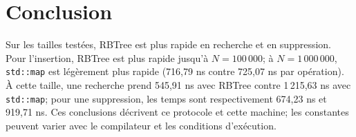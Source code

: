 \documentclass[11pt,a4paper]{article}
\begin{document}
\section{\textcolor{bleuTP}{Conclusion}}
Sur les tailles testées, RBTree est plus rapide en recherche et en suppression.
Pour l'insertion, RBTree est plus rapide jusqu'à $N=100\,000$; à
$N=1\,000\,000$, \texttt{std::map} est légèrement plus rapide
(716,79 ns contre 725,07 ns par opération). À cette taille, une recherche
prend 545,91 ns avec RBTree contre 1\,215,63 ns avec \texttt{std::map};
pour une suppression, les temps sont respectivement 674,23 ns et 919,71 ns.
Ces conclusions décrivent ce protocole et cette machine; les constantes
peuvent varier avec le compilateur et les conditions d'exécution.
\end{document}
